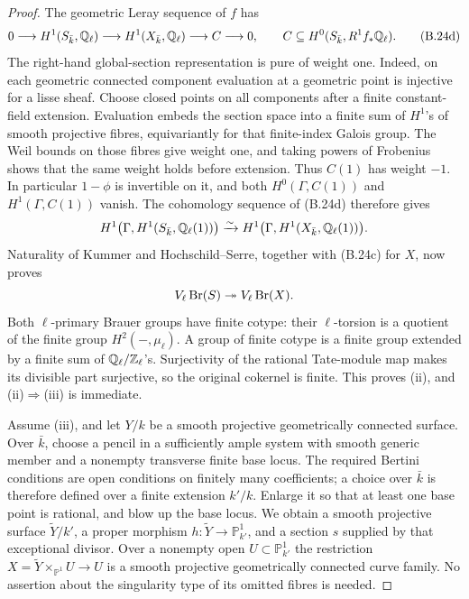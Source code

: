 \begin{proof}
The geometric Leray sequence of \(f\) has
\[
 0\longrightarrow H^1(S_{\bar k},\mathbb Q_\ell)
 \longrightarrow H^1(X_{\bar k},\mathbb Q_\ell)
 \longrightarrow C\longrightarrow0,
 \qquad
 C\subseteq H^0(S_{\bar k},R^1f_*\mathbb Q_\ell).
 \tag{B.24d}
\]
The right-hand global-section representation is pure of weight
one.  Indeed, on each geometric connected component evaluation
at a geometric point is injective for a lisse sheaf.  Choose
closed points on all components after a finite constant-field
extension.  Evaluation embeds the section space into a finite
sum of \(H^1\)'s of smooth projective fibres, equivariantly for
that finite-index Galois group.  The Weil bounds on those fibres
give weight one, and taking powers of Frobenius shows that the
same weight holds before extension.  Thus \(C(1)\) has weight
\(-1\).  In particular \(1-\phi\) is invertible on it, and
both \(H^0(\Gamma,C(1))\) and \(H^1(\Gamma,C(1))\) vanish.
The cohomology sequence of (B.24d) therefore gives
\[
 H^1\bigl(\Gamma,H^1(S_{\bar k},\mathbb Q_\ell(1))\bigr)
 \xrightarrow{\sim}
 H^1\bigl(\Gamma,H^1(X_{\bar k},\mathbb Q_\ell(1))\bigr).
\]
Naturality of Kummer and Hochschild--Serre, together with
(B.24c) for \(X\), now proves
\[
 V_\ell\operatorname{Br}(S)\twoheadrightarrow V_\ell\operatorname{Br}(X).
\]
Both \(\ell\)-primary Brauer groups have finite cotype: their
\(\ell\)-torsion is a quotient of the finite group
\(H^2(-,\mu_\ell)\).  A group of finite cotype is a finite
group extended by a finite sum of \(\mathbb Q_\ell/\mathbb Z_\ell\)'s.
Surjectivity of the rational Tate-module map makes its divisible
part surjective, so the original cokernel is finite.  This proves
(ii), and (ii)\(\Rightarrow\)(iii) is immediate.

Assume (iii), and let \(Y/k\) be a smooth projective
geometrically connected surface.  Over \(\bar k\), choose a
pencil in a sufficiently ample system with smooth generic member
and a nonempty transverse finite base locus.  The required
Bertini conditions are open conditions on finitely many
coefficients; a choice over \(\bar k\) is therefore defined
over a finite extension \(k'/k\).  Enlarge it so that at least
one base point is rational, and blow up the base locus.  We
obtain a smooth projective surface \(\widetilde Y/k'\), a
proper morphism \(h:\widetilde Y\to\mathbb P^1_{k'}\), and
a section \(s\) supplied by that exceptional divisor.
Over a nonempty open \(U\subset\mathbb P^1_{k'}\) the
restriction \(X=\widetilde Y\times_{\mathbb P^1}U\to U\)
is a smooth projective geometrically connected curve family.
No assertion about the singularity type of its omitted fibres
is needed.


\end{proof}
